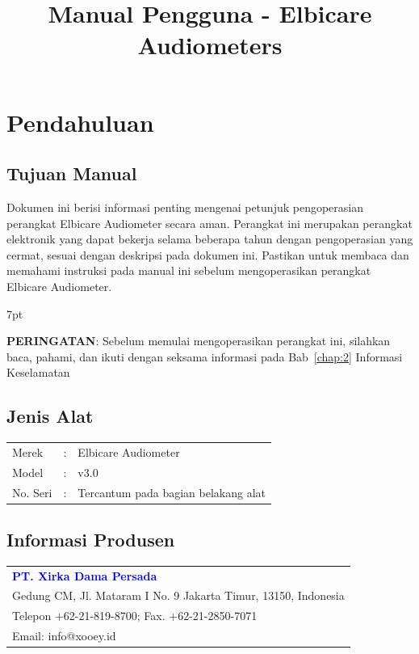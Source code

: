 \documentclass[11pt,a4paper,twoside,onecolumn]{book}
\title{Manual Pengguna - Elbicare Audiometers}
\newenvironment{formalred}{%
	\def\FrameCommand{%
		\hspace{1pt}%
		{\color{red}\vrule width 2pt}%
		{\color{formalshade}\vrule width 4pt}%
		\colorbox{formalshade}%
	}%
	\MakeFramed{\advance\hsize-\width\FrameRestore}%
	\noindent\hspace{-4.55pt}%
	\begin{adjustwidth}{}{7pt}%
		\vspace{2pt}\vspace{2pt}%
	}
	{%
		\vspace{2pt}\end{adjustwidth}\endMakeFramed%
}
\begin{document}
	
	\maketitle
	\renewcommand\contentsname{Daftar Isi}
	\tableofcontents
	
	\renewcommand\listfigurename{Daftar Gambar}
	\listoffigures
	
	\renewcommand\listtablename{Daftar Tabel}
	\listoftables
	\newpage
	
	\renewcommand\chaptername{Bab}
	
	\chapter{Pendahuluan}
		\section{Tujuan Manual}
		Dokumen ini berisi informasi penting mengenai petunjuk pengoperasian perangkat Elbicare Audiometer secara aman. Perangkat ini merupakan perangkat elektronik yang dapat bekerja selama beberapa tahun dengan pengoperasian yang cermat, sesuai dengan deskripsi pada dokumen ini. Pastikan untuk membaca dan memahami instruksi pada manual ini sebelum mengoperasikan perangkat Elbicare Audiometer. 
		
		\begin{formalred}
			\raisebox{0.325ex}{\resizebox{!}{2ex}{\danger}} \textbf{PERINGATAN}:
			Sebelum memulai mengoperasikan perangkat ini, silahkan baca, pahami, dan ikuti dengan seksama informasi pada Bab~\ref{chap:2} Informasi Keselamatan 
		\end{formalred}
		
		\section{Jenis Alat}
		\begin{tabular}{lcl}
			Merek & : & Elbicare Audiometer\\
			Model & : & v3.0\\
			No. Seri & : & Tercantum pada bagian belakang alat\\
		\end{tabular}
		
		\section{Informasi Produsen}
		\begin{tabular}{l}
			\textbf{\textcolor{blue}{PT. Xirka Dama Persada}}\\
			Gedung CM, Jl. Mataram I No. 9 Jakarta Timur, 13150, Indonesia\\
			Telepon +62-21-819-8700; Fax. +62-21-2850-7071\\
			Email: info@xooey.id\\
		\end{tabular}
		
\end{document}
